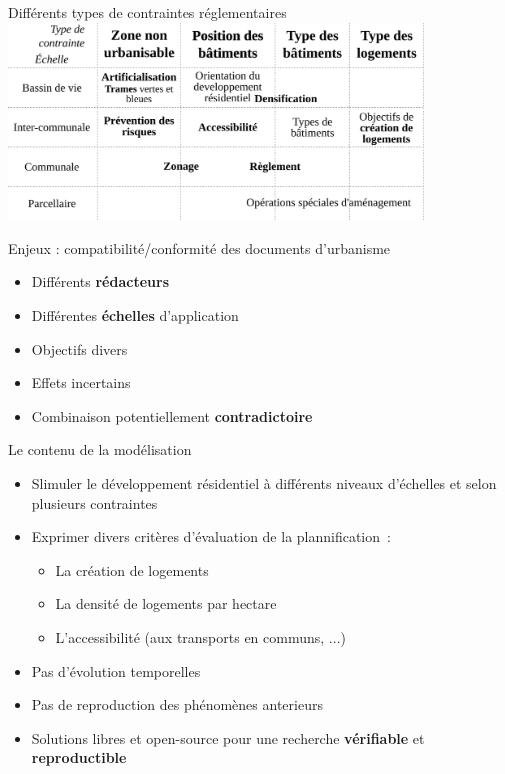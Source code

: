 \documentclass[xcolor=table]{beamer}
\begin{document}
\begin{frame}{Différents types de contraintes réglementaires} 
	\includegraphics[width=11cm]{Images/synthese-doc.png}
\end{frame}

\begin{frame}{Enjeux : compatibilité/conformité des documents d'urbanisme}
	\begin{itemize}
		\item Différents \textbf{rédacteurs}
		\item Différentes \textbf{échelles} d'application
		\item Objectifs divers
		\item Effets incertains 
		\item Combinaison potentiellement \textbf{contradictoire}
	\end{itemize}
\end{frame}

\begin{frame}{Le contenu de la modélisation}
	\begin{itemize}
		\item<1-> Slimuler le développement résidentiel à différents niveaux d'échelles et selon plusieurs contraintes
		\item<2-> Exprimer divers critères d'évaluation de la plannification~:
		\begin{itemize}	
			\item<3-> La création de logements
			\item<4-> La densité de logements par hectare
			\item<5-> L'accessibilité (aux transports en communs, ...)
		\end{itemize}
		\item<6-> Pas d'évolution temporelles
		\item<6-> Pas de reproduction des phénomènes anterieurs
		\item<7-> Solutions libres et open-source pour une recherche \textbf{vérifiable} et \textbf{reproductible}
	\end{itemize}
\end{frame}
\end{document}
